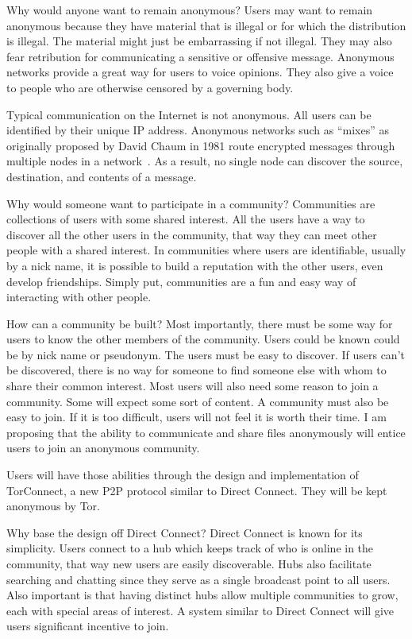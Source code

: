 \documentclass{article}
\begin{document}
Why would anyone want to remain anonymous?  Users may want to remain anonymous because they have material that is illegal or for which the distribution is illegal.  The material might just be embarrassing if not illegal.  They may also fear retribution for communicating a sensitive or offensive message.  Anonymous networks provide a great way for users to voice opinions.  They also give a voice to people who are otherwise censored by a governing body.

Typical communication on the Internet is not anonymous.  All users can be identified by their unique IP address.  Anonymous networks such as ``mixes'' as originally proposed by David Chaum in 1981 route encrypted messages through multiple nodes in a network~\cite{chaum-mix}.  As a result, no single node can discover the source, destination, and contents of a message.

Why would someone want to participate in a community?  Communities are collections of users with some shared interest.  All the users have a way to discover all the other users in the community, that way they can meet other people with a shared interest.  In communities where users are identifiable, usually by a nick name, it is possible to build a reputation with the other users, even develop friendships.  Simply put, communities are a fun and easy way of interacting with other people.

How can a community be built?  Most importantly, there must be some way for users to know the other members of the community.  Users could be known could be by nick name or pseudonym.  The users must be easy to discover.  If users can't be discovered, there is no way for someone to find someone else with whom to share their common interest.  Most users will also need some reason to join a community.  Some will expect some sort of content.  A community must also be easy to join.  If it is too difficult, users will not feel it is worth their time.  I am proposing that the ability to communicate and share files anonymously will entice users to join an anonymous community.

Users will have those abilities through the design and implementation of TorConnect, a new P2P protocol similar to Direct Connect.  They will be kept anonymous by Tor.

Why base the design off Direct Connect?  Direct Connect is known for its simplicity.  Users connect to a hub which keeps track of who is online in the community, that way new users are easily discoverable.  Hubs also facilitate searching and chatting since they serve as a single broadcast point to all users.  Also important is that having distinct hubs allow multiple communities to grow, each with special areas of interest.  A system similar to Direct Connect will give users significant incentive to join.
\end{document}
